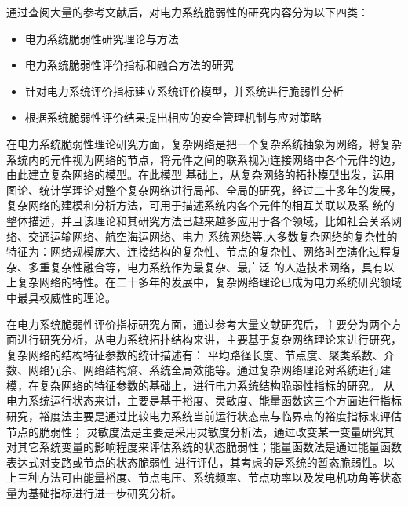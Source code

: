 通过查阅大量的参考文献后，对电力系统脆弱性的研究内容分为以下四类：
\begin{itemize}
  \item 电力系统脆弱性研究理论与方法
  \item 电力系统脆弱性评价指标和融合方法的研究
  \item 针对电力系统评价指标建立系统评价模型，并系统进行脆弱性分析
  \item 根据系统脆弱性评价结果提出相应的安全管理机制与应对策略 
\end{itemize}

在电力系统脆弱性理论研究方面，复杂网络是把一个复杂系统抽象为网络，将复杂系统内的元件视为网络的节点，将元件之间的联系视为连接网络中各个元件的边，由此建立复杂网络的模型。在此模型
基础上，从复杂网络的拓扑模型出发，运用图论、统计学理论对整个复杂网络进行局部、全局的研究，经过二十多年的发展，复杂网络的建模和分析方法，可用于描述系统内各个元件的相互关联以及系
统的整体描述，并且该理论和其研究方法已越来越多应用于各个领域，比如社会关系网络\cite{refs33}、交通运输网络\cite{refs34,refs35,refs36}、航空海运网络\cite{refs38,refs39}、电力
系统网络\cite{refs40,refs41}等,大多数复杂网络的复杂性的特征为：网络规模庞大、连接结构的复杂性、节点的复杂性、网络时空演化过程复杂、多重复杂性融合等，电力系统作为最复杂、最广泛
的人造技术网络，具有以上复杂网络的特性。在二十多年的发展中，复杂网络理论已成为电力系统研究领域中最具权威性的理论。

在电力系统脆弱性评价指标研究方面，通过参考大量文献研究后，主要分为两个方面进行研究分析，从电力系统拓扑结构来讲，主要基于复杂网络理论来进行研究，复杂网络的结构特征参数的统计描述有：
平均路径长度、节点度、聚类系数、介数、网络冗余、网络结构熵、系统全局效能等。通过复杂网络理论对系统进行建模，在复杂网络的特征参数的基础上，进行电力系统结构脆弱性指标的研究。
从电力系统运行状态来讲，主要是基于裕度、灵敏度、能量函数这三个方面进行指标研究，裕度法主要是通过比较电力系统当前运行状态点与临界点的裕度指标来评估节点的脆弱性\cite{refs42,refs43,refs44}；
灵敏度法是主要是采用灵敏度分析法，通过改变某一变量研究其对其它系统变量的影响程度来评估系统的状态脆弱性\cite{refs45,refs46}；能量函数法是通过能量函数表达式对支路或节点的状态脆弱性
进行评估，其考虑的是系统的暂态脆弱性\cite{refs47,refs48,refs49}。以上三种方法可由能量裕度、节点电压、系统频率、节点功率以及发电机功角等状态量为基础指标进行进一步研究分析。

